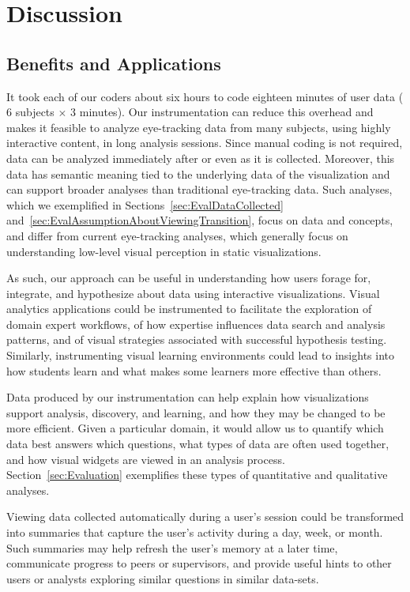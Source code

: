 ﻿\section{Discussion}
\label{sec:Discussion}
\subsection{Benefits and Applications}
\label{sec:Benefits}

It took each of our coders about six hours to code eighteen minutes of user data ($6$ subjects $\times$ $3$ minutes). Our instrumentation can reduce this overhead and makes it feasible to analyze eye-tracking data from many subjects, using highly interactive content, in long analysis sessions. Since manual coding is not required, data can be analyzed immediately after or even as it is collected.  Moreover, this data has semantic meaning tied to the underlying data of the visualization and can support broader analyses than traditional eye-tracking data. Such analyses, which we exemplified in Sections~\ref{sec:EvalDataCollected} and~\ref{sec:EvalAssumptionAboutViewingTransition}, focus on data and concepts, and differ from current eye-tracking analyses, which generally focus on understanding low-level visual perception in static visualizations.

As such, our approach can be useful in understanding how users forage for, integrate, and hypothesize about data using interactive visualizations. Visual analytics applications could be instrumented to facilitate the exploration of domain expert workflows, of how expertise influences data search and analysis patterns, and of visual strategies associated with successful hypothesis testing. Similarly, instrumenting visual learning environments could lead to insights into how students learn and what makes some learners more effective than others. 

Data produced by our instrumentation can help explain how visualizations support analysis, discovery, and learning, and how they may be changed to be more efficient. Given a particular domain, it would allow us to quantify which data best answers which questions, what types of data are often used together, and how visual widgets are viewed in an analysis process. Section~\ref{sec:Evaluation} exemplifies these types of quantitative and qualitative analyses. 

Viewing data collected automatically during a user's session could be transformed into summaries that capture the user's activity during a day, week, or month.  Such summaries may help refresh the user's memory at a later time, communicate progress to peers or supervisors, and provide useful hints to other users or analysts exploring similar questions in similar data-sets.

